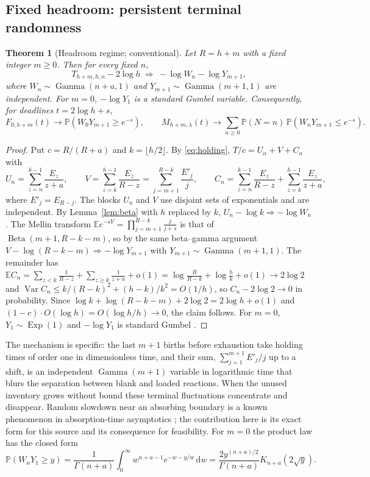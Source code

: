 \documentclass[11pt,a4paper]{article}
\theoremstyle{plain}
\newtheorem{theorem}{Theorem}[section]
\theoremstyle{definition}
\theoremstyle{remark}
\newcommand{\Prob}{\mathbb P}
\newcommand{\E}{\mathbb E}
\newcommand{\Var}{\operatorname{Var}}
\newcommand{\dd}{\,\mathrm d}
\DeclareMathOperator{\Gam}{Gamma}
\DeclareMathOperator{\Bet}{Beta}
\DeclareMathOperator{\Ex}{Exp}
\begin{document}
\subsection{Fixed headroom: persistent terminal randomness}
\begin{theorem}[Headroom regime; conventional]\label{thm:headroom}
Let $R=h+m$ with a fixed integer $m\ge0$. Then for every fixed $n$,
\[
T_{h+m,h,n}-2\log h\ \Rightarrow\ -\log W_n-\log Y_{m+1},
\]
where $W_n\sim\Gam(n+a,1)$ and $Y_{m+1}\sim\Gam(m+1,1)$ are independent. For $m=0$, $-\log Y_1$ is a standard Gumbel variable. Consequently, for deadlines $t=2\log h+s$,
\[
F_{0,h+m}(t)\to\Prob(W_0Y_{m+1}\ge e^{-s}),\qquad M_{h+m,\lambda}(t)\to\sum_{n\ge0}\Prob(N=n)\,\Prob(W_nY_{m+1}\le e^{-s}).
\]
\end{theorem}
\begin{proof}
Put $c=R/(R+a)$ and $k=\lfloor h/2\rfloor$. By \eqref{eq:holding}, $T/c=U_n+V+C_n$ with
\[
U_n=\sum_{z=n}^{k-1}\frac{E_z}{z+a},\qquad V=\sum_{z=k}^{h-1}\frac{E_z}{R-z}=\sum_{j=m+1}^{R-k}\frac{E'_j}{j},\qquad
C_n=\sum_{z=n}^{k-1}\frac{E_z}{R-z}+\sum_{z=k}^{h-1}\frac{E_z}{z+a},
\]
where $E'_j=E_{R-j}$. The blocks $U_n$ and $V$ use disjoint sets of exponentials and are independent. By Lemma~\ref{lem:beta} with $h$ replaced by $k$, $U_n-\log k\Rightarrow-\log W_n$. The Mellin transform $\E e^{-sV}=\prod_{j=m+1}^{R-k}\frac{j}{j+s}$ is that of $\Bet(m+1,R-k-m)$, so by the same beta--gamma argument $V-\log(R-k-m)\Rightarrow-\log Y_{m+1}$ with $Y_{m+1}\sim\Gam(m+1,1)$. The remainder has $\E C_n=\sum_{z<k}\frac1{R-z}+\sum_{z\ge k}\frac1{z+a}+o(1)=\log\frac{R}{R-k}+\log\frac hk+o(1)\to2\log2$ and $\Var C_n\le k/(R-k)^2+(h-k)/k^2=O(1/h)$, so $C_n-2\log2\to0$ in probability. Since $\log k+\log(R-k-m)+2\log2=2\log h+o(1)$ and $(1-c)\cdot O(\log h)=O(\log h/h)\to0$, the claim follows. For $m=0$, $Y_1\sim\Ex(1)$ and $-\log Y_1$ is standard Gumbel \citep{erdosrenyi1961}.
\end{proof}
The mechanism is specific: the last $m+1$ births before exhaustion take holding times of order one in dimensionless time, and their sum, $\sum_{j=1}^{m+1}E'_j/j$ up to a shift, is an independent $\Gam(m+1)$ variable in logarithmic time that blurs the separation between blank and loaded reactions. When the unused inventory grows without bound these terminal fluctuations concentrate and disappear. Random slowdown near an absorbing boundary is a known phenomenon in absorption-time asymptotics \citep{hathcock2022}; the contribution here is its exact form for this source and its consequence for feasibility. For $m=0$ the product law has the closed form
\begin{equation}\label{eq:bessel}
\Prob(W_nY_1\ge y)=\frac1{\Gamma(n+a)}\int_0^\infty w^{n+a-1}e^{-w-y/w}\dd w=\frac{2y^{(n+a)/2}}{\Gamma(n+a)}K_{n+a}(2\sqrt y).
\end{equation}
\end{document}
